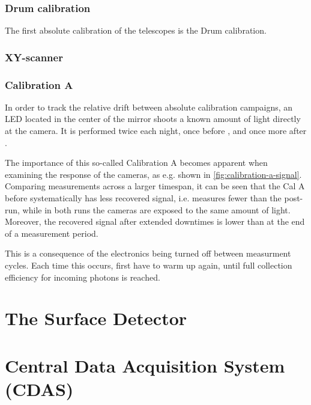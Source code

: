 \subsubsection{Drum calibration}

The first absolute calibration of the \FD telescopes is the Drum calibration. 


\subsubsection{XY-scanner}



\subsubsection{Calibration A}

In order to track the relative drift between absolute calibration campaigns, an 
LED located in the center of the mirror shoots a known amount of light directly 
at the \FD camera. It is performed twice each night, once before \DAQ, and once 
more after \DAQ.

The importance of this so-called Calibration A becomes apparent when examining the
response of the \FD cameras, as e.g. shown in \autoref{fig:calibration-a-signal}.
Comparing measurements across a larger timespan, it can be seen that the Cal A
before \DAQ systematically has less recovered signal, i.e. measures fewer \ADC
than the post-\DAQ run, while in both runs the cameras are exposed to the same 
amount of light. Moreover, the recovered signal after extended downtimes is lower
than at the end of a measurement period.

This is a consequence of the \PMT electronics being turned off between measurment 
cycles. Each time this occurs, \PMTs first have to warm up again, until full
collection efficiency for incoming photons is reached.



\section{The Surface Detector}
\label{sec:sd}


\section{Central Data Acquisition System (CDAS)}
\label{sec:cdas}



